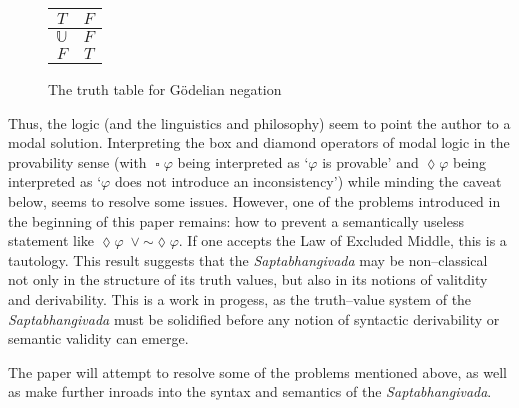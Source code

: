 \documentclass[12pt]{article}
\renewcommand{\phi}{\varphi}
\newcommand{\lognot}{\ensuremath{\sim \!}}
\DeclareMathOperator{\logbox}{\square}
\DeclareMathOperator{\logdiamond}{\lozenge}
\begin{document}
\begin{figure}[h!]
        \centering
            \begin{tabular}{ c | c }
                $T$ & $F$ \\
                \hline
                $\mathbb{U}$ & $F$ \\
                \hline
                $F$ & $T$ \\
            \end{tabular}
            \label{GoedelNot}
    \caption{The truth table for G\"{o}delian negation}
\end{figure}

Thus, the logic (and the linguistics and philosophy) seem to point the
author to a modal solution. Interpreting the box and diamond operators of modal logic in the provability sense (with $\logbox \phi$ being interpreted
as `$\phi$ is provable' and $\logdiamond \phi$ being interpreted as `$\phi$ does not introduce an inconsistency') while minding the caveat below,
seems to resolve some issues. However, one of the problems introduced in the beginning of this paper remains: how to prevent a semantically useless
statement like $\logdiamond \phi \; \vee \lognot \logdiamond \phi$. If one accepts the Law of Excluded Middle, this is a tautology. This result suggests
that the \emph{Saptabhangivada} may be non--classical not only in the structure of its truth values, but also in its notions of valitdity
and derivability. This is a work in progess, as the truth--value system of the \emph{Saptabhangivada} must be solidified before any notion of syntactic 
derivability or semantic validity can emerge. 

\bigskip

The paper will attempt to resolve some of the problems mentioned above, as well as make further inroads into the syntax and semantics of the 
\emph{Saptabhangivada}.

\printbibliography
\end{document}
